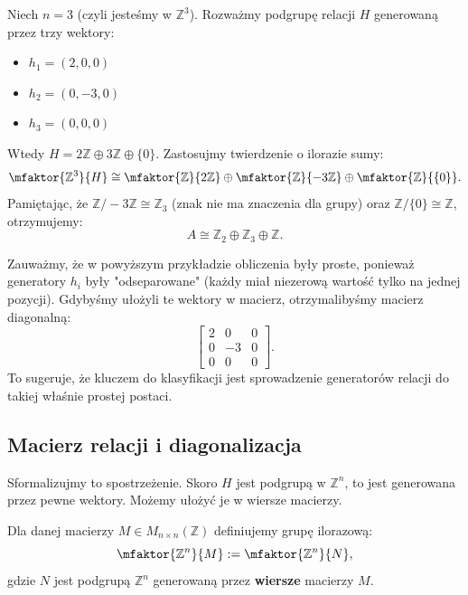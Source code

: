 \begin{eg}
    Niech $n=3$ (czyli jesteśmy w $\mathbb{Z}^3$).
    Rozważmy podgrupę relacji $H$ generowaną przez trzy wektory:
    \begin{itemize}
        \item $h_1 = (2,0,0)$
        \item $h_2 = (0,-3,0)$
        \item $h_3 = (0,0,0)$
    \end{itemize}
    Wtedy $H = 2\mathbb{Z} \oplus 3\mathbb{Z} \oplus \{0\}$.
    Zastosujmy twierdzenie o ilorazie sumy:
    \[
    \mfaktor{\mathbb{Z} ^3}{H} \cong \mfaktor{\mathbb{Z}}{2\mathbb{Z}} \oplus \mfaktor{\mathbb{Z}}{-3\mathbb{Z}} \oplus \mfaktor{\mathbb{Z}}{\{0\}}.
    \]
    Pamiętając, że $\mathbb{Z}/-3\mathbb{Z} \cong \mathbb{Z}_3$ (znak nie ma znaczenia dla grupy) oraz $\mathbb{Z}/\{0\} \cong \mathbb{Z}$, otrzymujemy:
    \[
    A \cong \mathbb{Z}_2 \oplus \mathbb{Z}_3 \oplus \mathbb{Z}.
    \]
\end{eg}

\begin{intuition}
    Zauważmy, że w powyższym przykładzie obliczenia były proste, ponieważ generatory $h_i$ były "odseparowane" (każdy miał niezerową wartość tylko na jednej pozycji).
    Gdybyśmy ułożyli te wektory w macierz, otrzymalibyśmy macierz diagonalną:
    \[
    \begin{bmatrix} 2 & 0 & 0 \\ 0 & -3 & 0 \\ 0 & 0 & 0 \end{bmatrix}.
    \]
    To sugeruje, że kluczem do klasyfikacji jest sprowadzenie generatorów relacji do takiej właśnie prostej postaci.
\end{intuition}

\subsection{Macierz relacji i diagonalizacja}

Sformalizujmy to spostrzeżenie. Skoro $H$ jest podgrupą w $\mathbb{Z}^n$, to jest generowana przez pewne wektory. Możemy ułożyć je w wiersze macierzy.

\begin{definition}
    Dla danej macierzy $M\in M_{n\times n}\left( \mathbb{Z} \right)$ definiujemy grupę ilorazową:
    \[
    \mfaktor{\mathbb{Z} ^{n}}{M} := \mfaktor{\mathbb{Z} ^{n}}{N},
    \]
    gdzie $N$ jest podgrupą $\mathbb{Z}^{n}$ generowaną przez \textbf{wiersze} macierzy $M$.
\end{definition}


